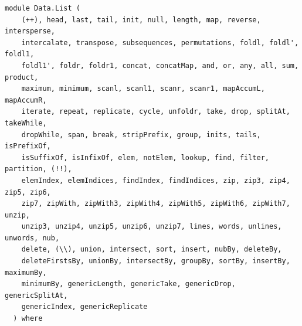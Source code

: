 \label{module:Data.List}
\haddockbeginheader
{\haddockverb\begin{verbatim}
module Data.List (
    (++), head, last, tail, init, null, length, map, reverse, intersperse,
    intercalate, transpose, subsequences, permutations, foldl, foldl', foldl1,
    foldl1', foldr, foldr1, concat, concatMap, and, or, any, all, sum, product,
    maximum, minimum, scanl, scanl1, scanr, scanr1, mapAccumL, mapAccumR,
    iterate, repeat, replicate, cycle, unfoldr, take, drop, splitAt, takeWhile,
    dropWhile, span, break, stripPrefix, group, inits, tails, isPrefixOf,
    isSuffixOf, isInfixOf, elem, notElem, lookup, find, filter, partition, (!!),
    elemIndex, elemIndices, findIndex, findIndices, zip, zip3, zip4, zip5, zip6,
    zip7, zipWith, zipWith3, zipWith4, zipWith5, zipWith6, zipWith7, unzip,
    unzip3, unzip4, unzip5, unzip6, unzip7, lines, words, unlines, unwords, nub,
    delete, (\\), union, intersect, sort, insert, nubBy, deleteBy,
    deleteFirstsBy, unionBy, intersectBy, groupBy, sortBy, insertBy, maximumBy,
    minimumBy, genericLength, genericTake, genericDrop, genericSplitAt,
    genericIndex, genericReplicate
  ) where\end{verbatim}}
\haddockendheader


